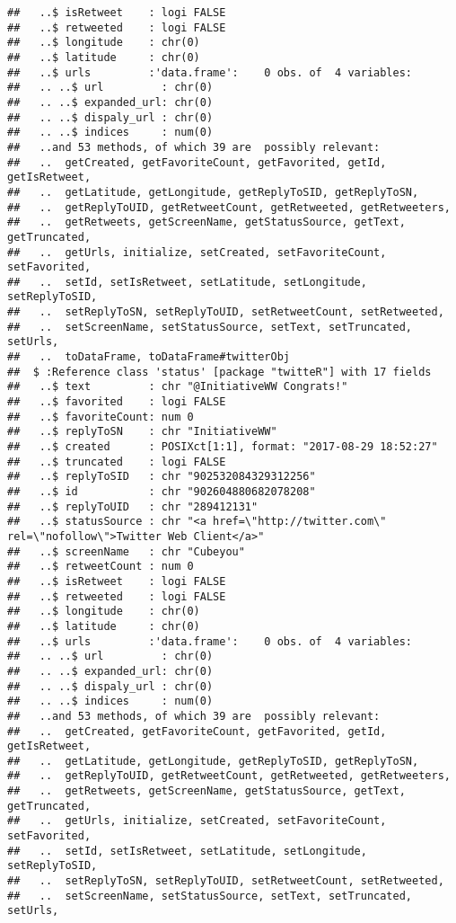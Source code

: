 \documentclass[]{article}
\begin{document}
\begin{verbatim}
##   ..$ isRetweet    : logi FALSE
##   ..$ retweeted    : logi FALSE
##   ..$ longitude    : chr(0) 
##   ..$ latitude     : chr(0) 
##   ..$ urls         :'data.frame':    0 obs. of  4 variables:
##   .. ..$ url         : chr(0) 
##   .. ..$ expanded_url: chr(0) 
##   .. ..$ dispaly_url : chr(0) 
##   .. ..$ indices     : num(0) 
##   ..and 53 methods, of which 39 are  possibly relevant:
##   ..  getCreated, getFavoriteCount, getFavorited, getId, getIsRetweet,
##   ..  getLatitude, getLongitude, getReplyToSID, getReplyToSN,
##   ..  getReplyToUID, getRetweetCount, getRetweeted, getRetweeters,
##   ..  getRetweets, getScreenName, getStatusSource, getText, getTruncated,
##   ..  getUrls, initialize, setCreated, setFavoriteCount, setFavorited,
##   ..  setId, setIsRetweet, setLatitude, setLongitude, setReplyToSID,
##   ..  setReplyToSN, setReplyToUID, setRetweetCount, setRetweeted,
##   ..  setScreenName, setStatusSource, setText, setTruncated, setUrls,
##   ..  toDataFrame, toDataFrame#twitterObj
##  $ :Reference class 'status' [package "twitteR"] with 17 fields
##   ..$ text         : chr "@InitiativeWW Congrats!"
##   ..$ favorited    : logi FALSE
##   ..$ favoriteCount: num 0
##   ..$ replyToSN    : chr "InitiativeWW"
##   ..$ created      : POSIXct[1:1], format: "2017-08-29 18:52:27"
##   ..$ truncated    : logi FALSE
##   ..$ replyToSID   : chr "902532084329312256"
##   ..$ id           : chr "902604880682078208"
##   ..$ replyToUID   : chr "289412131"
##   ..$ statusSource : chr "<a href=\"http://twitter.com\" rel=\"nofollow\">Twitter Web Client</a>"
##   ..$ screenName   : chr "Cubeyou"
##   ..$ retweetCount : num 0
##   ..$ isRetweet    : logi FALSE
##   ..$ retweeted    : logi FALSE
##   ..$ longitude    : chr(0) 
##   ..$ latitude     : chr(0) 
##   ..$ urls         :'data.frame':    0 obs. of  4 variables:
##   .. ..$ url         : chr(0) 
##   .. ..$ expanded_url: chr(0) 
##   .. ..$ dispaly_url : chr(0) 
##   .. ..$ indices     : num(0) 
##   ..and 53 methods, of which 39 are  possibly relevant:
##   ..  getCreated, getFavoriteCount, getFavorited, getId, getIsRetweet,
##   ..  getLatitude, getLongitude, getReplyToSID, getReplyToSN,
##   ..  getReplyToUID, getRetweetCount, getRetweeted, getRetweeters,
##   ..  getRetweets, getScreenName, getStatusSource, getText, getTruncated,
##   ..  getUrls, initialize, setCreated, setFavoriteCount, setFavorited,
##   ..  setId, setIsRetweet, setLatitude, setLongitude, setReplyToSID,
##   ..  setReplyToSN, setReplyToUID, setRetweetCount, setRetweeted,
##   ..  setScreenName, setStatusSource, setText, setTruncated, setUrls,

\end{verbatim}
\end{document}

